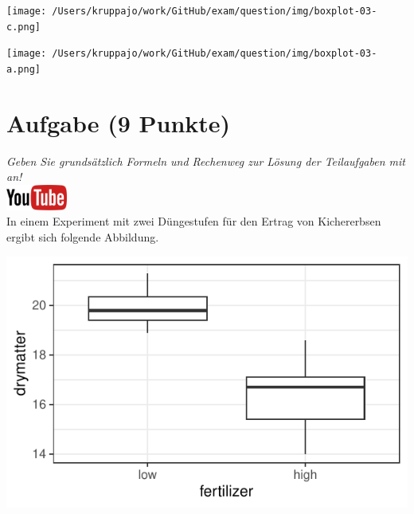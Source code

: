 \documentclass[a4paper, 10pt]{scrartcl}\usepackage[]{graphicx}\usepackage[]{xcolor}
\makeatletter
\def\maxwidth{ %
  \ifdim\Gin@nat@width>\linewidth
    \linewidth
  \else
    \Gin@nat@width
  \fi
}
\makeatother
\begin{document}
\vspace*{8cm}

\begin{minipage}[c]{.4\linewidth} %
  \texttt{[image: /Users/kruppajo/work/GitHub/exam/question/img/boxplot-03-c.png]}
\end{minipage}
\hspace{.1\linewidth}%
\begin{minipage}[c]{.4\linewidth} %
  \texttt{[image: /Users/kruppajo/work/GitHub/exam/question/img/boxplot-03-a.png]}
\end{minipage}



 
\clearpage

\section{Aufgabe \hfill (9 Punkte)}

\textit{Geben Sie grunds{\"a}tzlich Formeln und Rechenweg zur L{\"o}sung der
  Teilaufgaben mit an!} \\[1Ex]

\hfill\href{https://youtu.be/lXI_H6m26HE}{\includegraphics[width =
  2cm]{img/youtube}}\\[1Ex]


In einem Experiment mit zwei D{\"u}ngestufen f{\"u}r den Ertrag von Kichererbsen
ergibt sich folgende Abbildung. 





{\centering \includegraphics[width=\maxwidth]{img/boxplot-4b-1} 

}
\end{document}
